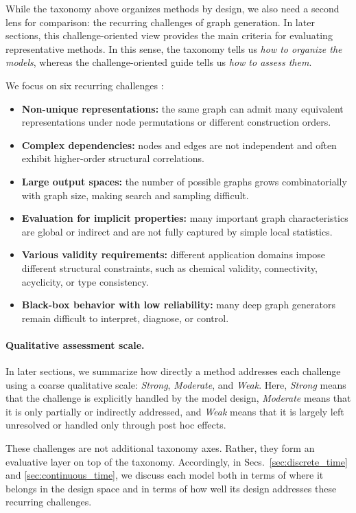 \documentclass{article}
\begin{document}
While the taxonomy above organizes methods by design, we also need a second lens for comparison: the recurring challenges of graph generation. In later sections, this challenge-oriented view provides the main criteria for evaluating representative methods. In this sense, the taxonomy tells us \emph{how to organize the models}, whereas the challenge-oriented guide tells us \emph{how to assess them}.

We focus on six recurring challenges \cite{guo2022systematic}:
\begin{itemize}[leftmargin=*]
    \item \textbf{Non-unique representations:} the same graph can admit many equivalent representations under node permutations or different construction orders.
    \item \textbf{Complex dependencies:} nodes and edges are not independent and often exhibit higher-order structural correlations.
    \item \textbf{Large output spaces:} the number of possible graphs grows combinatorially with graph size, making search and sampling difficult.
    \item \textbf{Evaluation for implicit properties:} many important graph characteristics are global or indirect and are not fully captured by simple local statistics.
    \item \textbf{Various validity requirements:} different application domains impose different structural constraints, such as chemical validity, connectivity, acyclicity, or type consistency.
    \item \textbf{Black-box behavior with low reliability:} many deep graph generators remain difficult to interpret, diagnose, or control.
\end{itemize}

\paragraph{Qualitative assessment scale.}
In later sections, we summarize how directly a method addresses each challenge using a coarse qualitative scale:
\emph{Strong}, \emph{Moderate}, and \emph{Weak}. Here, \emph{Strong} means that the challenge is explicitly handled by the model design, \emph{Moderate} means that it is only partially or indirectly addressed, and \emph{Weak} means that it is largely left unresolved or handled only through post hoc effects.

These challenges are not additional taxonomy axes. Rather, they form an evaluative layer on top of the taxonomy. Accordingly, in Secs.~\ref{sec:discrete_time} and \ref{sec:continuous_time}, we discuss each model both in terms of where it belongs in the design space and in terms of how well its design addresses these recurring challenges.
\end{document}

